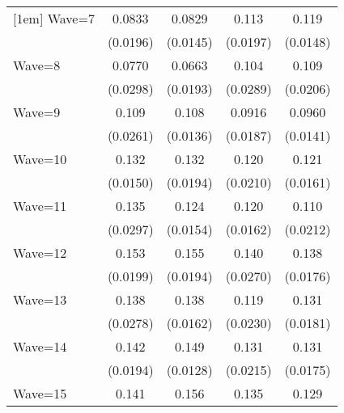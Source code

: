 {\begin{tabular}{l*{4}{c}}
[1em]
Wave=7              &      0.0833\sym{***}&      0.0829\sym{***}&       0.113\sym{***}&       0.119\sym{***}\\
                    &    (0.0196)         &    (0.0145)         &    (0.0197)         &    (0.0148)         \\
[1em]
Wave=8              &      0.0770\sym{**} &      0.0663\sym{***}&       0.104\sym{***}&       0.109\sym{***}\\
                    &    (0.0298)         &    (0.0193)         &    (0.0289)         &    (0.0206)         \\
[1em]
Wave=9              &       0.109\sym{***}&       0.108\sym{***}&      0.0916\sym{***}&      0.0960\sym{***}\\
                    &    (0.0261)         &    (0.0136)         &    (0.0187)         &    (0.0141)         \\
[1em]
Wave=10             &       0.132\sym{***}&       0.132\sym{***}&       0.120\sym{***}&       0.121\sym{***}\\
                    &    (0.0150)         &    (0.0194)         &    (0.0210)         &    (0.0161)         \\
[1em]
Wave=11             &       0.135\sym{***}&       0.124\sym{***}&       0.120\sym{***}&       0.110\sym{***}\\
                    &    (0.0297)         &    (0.0154)         &    (0.0162)         &    (0.0212)         \\
[1em]
Wave=12             &       0.153\sym{***}&       0.155\sym{***}&       0.140\sym{***}&       0.138\sym{***}\\
                    &    (0.0199)         &    (0.0194)         &    (0.0270)         &    (0.0176)         \\
[1em]
Wave=13             &       0.138\sym{***}&       0.138\sym{***}&       0.119\sym{***}&       0.131\sym{***}\\
                    &    (0.0278)         &    (0.0162)         &    (0.0230)         &    (0.0181)         \\
[1em]
Wave=14             &       0.142\sym{***}&       0.149\sym{***}&       0.131\sym{***}&       0.131\sym{***}\\
                    &    (0.0194)         &    (0.0128)         &    (0.0215)         &    (0.0175)         \\
[1em]
Wave=15             &       0.141\sym{***}&       0.156\sym{***}&       0.135\sym{***}&       0.129\sym{***}\\

\end{tabular}}
